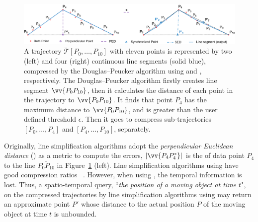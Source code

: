 \begin{figure}[tb!]
\centering
\vspace{-1ex}
\includegraphics[scale=0.76]{figures/Fig-DP.png}
\vspace{-1ex}
\caption{\small A trajectory $\dddot{\mathcal{T}}[P_0, \ldots, P_{10}]$  with eleven points is represented by two (left) and four (right) continuous line segments (solid blue), compressed by the Douglas--Peucker algorithm \cite{Douglas:Peucker} using \ped and \sed, respectively. The Douglas--Peucker algorithm firstly creates line segment $\protect\vv{P_0P_{10}}$, then it calculates the distance of each point in the trajectory to $\protect\vv{P_{0}P_{10}}$. It finds that point $P_{4}$ has the maximum distance to $\protect\vv{P_{0}P_{10}}$, and is greater than the user defined threshold $\epsilon$. Then it goes to compress sub-trajectories $[P_0, \ldots, P_{4}]$ and $[P_{4}, \ldots, P_{10}]$, separately.
}
\vspace{-2ex}
\label{fig:notations}
\end{figure}


Originally, line simplification algorithms adopt the \emph{perpendicular Euclidean distance} (\ped) as a metric to compute the errors,
\eg $|\vv{P_4P^*_4}|$ is the \ped of data point $P_4$ to the line $\overline{P_0P_{10}}$ in Figure~\ref{fig:notations} (left).
Line simplification algorithms using \ped have good compression ratios~ \cite{Douglas:Peucker, Hershberger:Speeding, Liu:BQS, Muckell:Compression, Chen:Trajectory, Cao:Spatio, Shi:Survey}.  However, when using \ped, the temporal information is lost. Thus, a spatio-temporal query, \eg ``\emph{the position of a moving object at time $t$}", on the compressed trajectories by line simplification algorithms using \ped may return an approximate point $P'$ whose distance to the actual position $P$ of the moving object at time $t$ is unbounded. %


